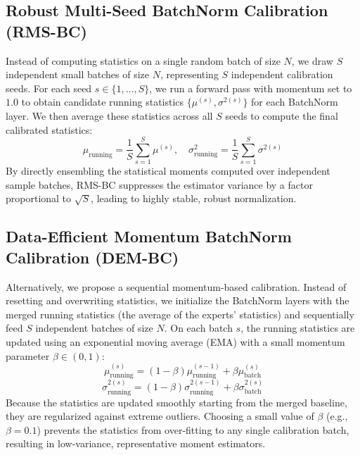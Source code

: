 \documentclass{article}
\begin{document}
\subsection{Robust Multi-Seed BatchNorm Calibration (RMS-BC)}
Instead of computing statistics on a single random batch of size $N$, we draw $S$ independent small batches of size $N$, representing $S$ independent calibration seeds. For each seed $s \in \{1, \dots, S\}$, we run a forward pass with momentum set to $1.0$ to obtain candidate running statistics $\{\mu^{(s)}, \sigma^{2(s)}\}$ for each BatchNorm layer. We then average these statistics across all $S$ seeds to compute the final calibrated statistics:
\begin{equation}
    \mu_{\text{running}} = \frac{1}{S} \sum_{s=1}^S \mu^{(s)}, \quad \sigma^2_{\text{running}} = \frac{1}{S} \sum_{s=1}^S \sigma^{2(s)}
\end{equation}
By directly ensembling the statistical moments computed over independent sample batches, RMS-BC suppresses the estimator variance by a factor proportional to $\sqrt{S}$, leading to highly stable, robust normalization.

\subsection{Data-Efficient Momentum BatchNorm Calibration (DEM-BC)}
Alternatively, we propose a sequential momentum-based calibration. Instead of resetting and overwriting statistics, we initialize the BatchNorm layers with the merged running statistics (the average of the experts' statistics) and sequentially feed $S$ independent batches of size $N$. On each batch $s$, the running statistics are updated using an exponential moving average (EMA) with a small momentum parameter $\beta \in (0, 1)$:
\begin{equation}
    \mu_{\text{running}}^{(s)} = (1 - \beta) \mu_{\text{running}}^{(s-1)} + \beta \mu_{\text{batch}}^{(s)}
\end{equation}
\begin{equation}
    \sigma_{\text{running}}^{2(s)} = (1 - \beta) \sigma_{\text{running}}^{2(s-1)} + \beta \sigma_{\text{batch}}^{2(s)}
\end{equation}
Because the statistics are updated smoothly starting from the merged baseline, they are regularized against extreme outliers. Choosing a small value of $\beta$ (e.g., $\beta = 0.1$) prevents the statistics from over-fitting to any single calibration batch, resulting in low-variance, representative moment estimators.
\end{document}
